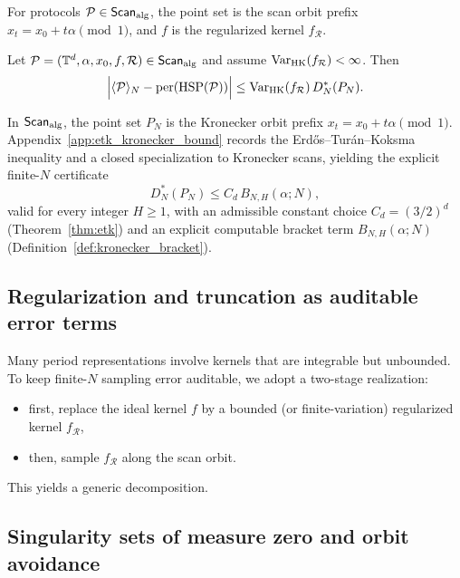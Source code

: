 For protocols $\mathcal{P}\in\mathsf{Scan}_{\mathrm{alg}}$, the point set is the scan orbit prefix $x_t=x_0+t\alpha\pmod{1}$, and $f$ is the regularized kernel $f_{\mathcal{R}}$.

\begin{corollary}
\label{cor:sampling_error}
Let $\mathcal{P}=(\mathbb{T}^d,\alpha,x_0,f,\mathcal{R})\in\mathsf{Scan}_{\mathrm{alg}}$ and assume $\mathrm{Var}_{\mathrm{HK}}(f_{\mathcal{R}})<\infty$. Then
\begin{equation}
\label{eq:sampling_error_bound}
\Big|\langle \mathcal{P} \rangle_N-\mathrm{per}(\mathrm{HSP}(\mathcal{P}))\Big|
\le \mathrm{Var}_{\mathrm{HK}}(f_{\mathcal{R}})\,D_N^\ast(P_N).
\end{equation}
\end{corollary}

\begin{remark}
\label{rem:kronecker_discrepancy_certificate}
In $\mathsf{Scan}_{\mathrm{alg}}$, the point set $P_N$ is the Kronecker orbit prefix $x_t=x_0+t\alpha\pmod{1}$. Appendix~\ref{app:etk_kronecker_bound} records the Erd\H{o}s--Tur\'an--Koksma inequality and a closed specialization to Kronecker scans, yielding the explicit finite-$N$ certificate
\[
D_N^\ast(P_N)\le C_d\,B_{N,H}(\alpha;N),
\]
valid for every integer $H\ge 1$, with an admissible constant choice $C_d=(3/2)^d$ (Theorem~\ref{thm:etk}) and an explicit computable bracket term $B_{N,H}(\alpha;N)$ (Definition~\ref{def:kronecker_bracket}).
\end{remark}

\subsection{Regularization and truncation as auditable error terms}
\label{sec:truncation_error}

Many period representations involve kernels that are integrable but unbounded. To keep finite-$N$ sampling error auditable, we adopt a two-stage realization:
\begin{itemize}
\item first, replace the ideal kernel $f$ by a bounded (or finite-variation) regularized kernel $f_{\mathcal{R}}$,
\item then, sample $f_{\mathcal{R}}$ along the scan orbit.
\end{itemize}
This yields a generic decomposition.

\subsection{Singularity sets of measure zero and orbit avoidance}
\label{sec:singularity_avoidance}

